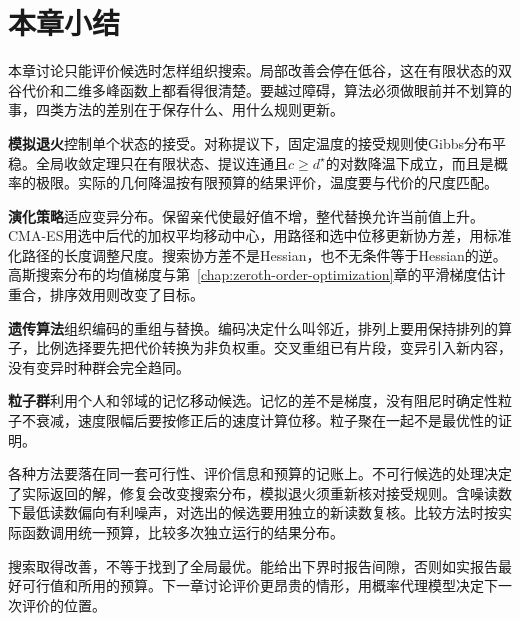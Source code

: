 \section{本章小结}
\label{sec:rs-summary}

本章讨论只能评价候选时怎样组织搜索。局部改善会停在低谷，这在有限状态的双谷代价和二维多峰函数上都看得很清楚。要越过障碍，算法必须做眼前并不划算的事，四类方法的差别在于保存什么、用什么规则更新。

\textbf{模拟退火}控制单个状态的接受。对称提议下，固定温度的接受规则使Gibbs分布平稳。全局收敛定理只在有限状态、提议连通且$c\geq d^\star$的对数降温下成立，而且是概率的极限。实际的几何降温按有限预算的结果评价，温度要与代价的尺度匹配。

\textbf{演化策略}适应变异分布。保留亲代使最好值不增，整代替换允许当前值上升。CMA-ES用选中后代的加权平均移动中心，用路径和选中位移更新协方差，用标准化路径的长度调整尺度。搜索协方差不是Hessian，也不无条件等于Hessian的逆。高斯搜索分布的均值梯度与第~\ref{chap:zeroth-order-optimization}章的平滑梯度估计重合，排序效用则改变了目标。

\textbf{遗传算法}组织编码的重组与替换。编码决定什么叫邻近，排列上要用保持排列的算子，比例选择要先把代价转换为非负权重。交叉重组已有片段，变异引入新内容，没有变异时种群会完全趋同。

\textbf{粒子群}利用个人和邻域的记忆移动候选。记忆的差不是梯度，没有阻尼时确定性粒子不衰减，速度限幅后要按修正后的速度计算位移。粒子聚在一起不是最优性的证明。

各种方法要落在同一套可行性、评价信息和预算的记账上。不可行候选的处理决定了实际返回的解，修复会改变搜索分布，模拟退火须重新核对接受规则。含噪读数下最低读数偏向有利噪声，对选出的候选要用独立的新读数复核。比较方法时按实际函数调用统一预算，比较多次独立运行的结果分布。

搜索取得改善，不等于找到了全局最优。能给出下界时报告间隙，否则如实报告最好可行值和所用的预算。下一章讨论评价更昂贵的情形，用概率代理模型决定下一次评价的位置。
